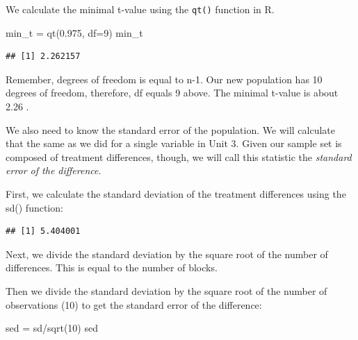 \documentclass[
]{book}
\newenvironment{Shaded}{\begin{snugshade}}{\end{snugshade}}
\newcommand{\AttributeTok}[1]{\textcolor[rgb]{0.77,0.63,0.00}{#1}}
\newcommand{\DecValTok}[1]{\textcolor[rgb]{0.00,0.00,0.81}{#1}}
\newcommand{\FloatTok}[1]{\textcolor[rgb]{0.00,0.00,0.81}{#1}}
\newcommand{\FunctionTok}[1]{\textcolor[rgb]{0.00,0.00,0.00}{#1}}
\newcommand{\NormalTok}[1]{#1}
\newcommand{\OtherTok}[1]{\textcolor[rgb]{0.56,0.35,0.01}{#1}}
\newcommand{\SpecialCharTok}[1]{\textcolor[rgb]{0.00,0.00,0.00}{#1}}
\begin{document}
We calculate the minimal t-value using the \texttt{qt()} function in R.

\begin{Shaded}
\begin{Highlighting}[]
\NormalTok{min\_t }\OtherTok{=} \FunctionTok{qt}\NormalTok{(}\FloatTok{0.975}\NormalTok{, }\AttributeTok{df=}\DecValTok{9}\NormalTok{)}
\NormalTok{min\_t}
\end{Highlighting}
\end{Shaded}

\begin{verbatim}
## [1] 2.262157
\end{verbatim}

Remember, degrees of freedom is equal to n-1. Our new population has 10
degrees of freedom, therefore, df equals 9 above. The minimal t-value is
about 2.26 .

We also need to know the standard error of the population. We will
calculate that the same as we did for a single variable in Unit 3. Given
our sample set is composed of treatment differences, though, we will
call this statistic the \emph{standard error of the difference}.

First, we calculate the standard deviation of the treatment differences
using the sd() function:

\begin{Shaded}
\end{Shaded}

\begin{verbatim}
## [1] 5.404001
\end{verbatim}

Next, we divide the standard deviation by the square root of the number
of differences. This is equal to the number of blocks.

Then we divide the standard deviation by the square root of the number
of observations (10) to get the standard error of the difference:

\begin{Shaded}
\begin{Highlighting}[]
\NormalTok{sed }\OtherTok{=}\NormalTok{ sd}\SpecialCharTok{/}\FunctionTok{sqrt}\NormalTok{(}\DecValTok{10}\NormalTok{)}
\NormalTok{sed}
\end{Highlighting}
\end{Shaded}
\end{document}

